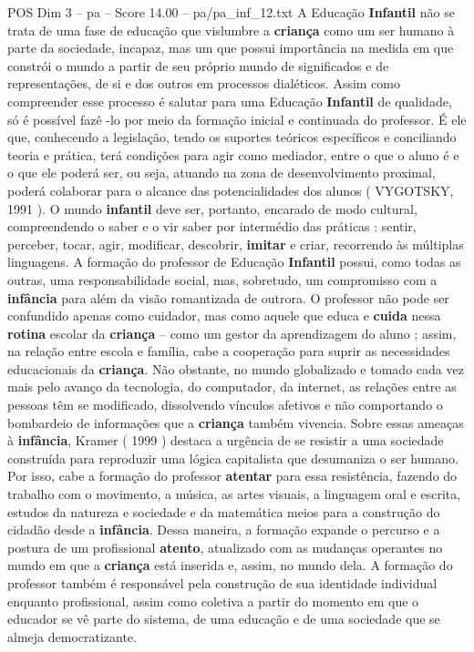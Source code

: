 \begin{textsample}{POS Dim 3 – pa – Score 14.00 – pa/pa\_inf\_12.txt}
A Educação \textbf{Infantil} não se trata de uma fase de educação que vislumbre a \textbf{criança} como um ser humano à parte da sociedade, incapaz, mas um que possui importância na medida em que constrói o mundo a partir de seu próprio mundo de significados e de representações, de si e dos outros em processos dialéticos.
Assim como compreender esse processo é salutar para uma Educação \textbf{Infantil} de qualidade, só é possível fazê -lo por meio da formação inicial e continuada do professor.
É ele que, conhecendo a legislação, tendo os suportes teóricos específicos e conciliando teoria e prática, terá condições para agir como mediador, entre o que o aluno é e o que ele poderá ser, ou seja, atuando na zona de desenvolvimento proximal, poderá colaborar para o alcance das potencialidades dos alunos ( VYGOTSKY, 1991 ).
O mundo \textbf{infantil} deve ser, portanto, encarado de modo cultural, compreendendo o saber e o vir saber por intermédio das práticas : sentir, perceber, tocar, agir, modificar, descobrir, \textbf{imitar} e criar, recorrendo às múltiplas linguagens.
A formação do professor de Educação \textbf{Infantil} possui, como todas as outras, uma responsabilidade social, mas, sobretudo, um compromisso com a \textbf{infância} para além da visão romantizada de outrora.
O professor não pode ser confundido apenas como cuidador, mas como aquele que educa e \textbf{cuida} nessa \textbf{rotina} escolar da \textbf{criança} – como um gestor da aprendizagem do aluno ; assim, na relação entre escola e família, cabe a cooperação para suprir as necessidades educacionais da \textbf{criança}.
Não obstante, no mundo globalizado e tomado cada vez mais pelo avanço da tecnologia, do computador, da internet, as relações entre as pessoas têm se modificado, dissolvendo vínculos afetivos e não comportando o bombardeio de informações que a \textbf{criança} também vivencia.
Sobre essas ameaças à \textbf{infância}, Kramer ( 1999 ) destaca a urgência de se resistir a uma sociedade construída para reproduzir uma lógica capitalista que desumaniza o ser humano.
Por isso, cabe a formação do professor \textbf{atentar} para essa resistência, fazendo do trabalho com o movimento, a música, as artes visuais, a linguagem oral e escrita, estudos da natureza e sociedade e da matemática meios para a construção do cidadão desde a \textbf{infância}.
Dessa maneira, a formação expande o percurso e a postura de um profissional \textbf{atento}, atualizado com as mudanças operantes no mundo em que a \textbf{criança} está inserida e, assim, no mundo dela.
A formação do professor também é responsável pela construção de sua identidade individual enquanto profissional, assim como coletiva a partir do momento em que o educador se vê parte do sistema, de uma educação e de uma sociedade que se almeja democratizante.

\end{textsample}
